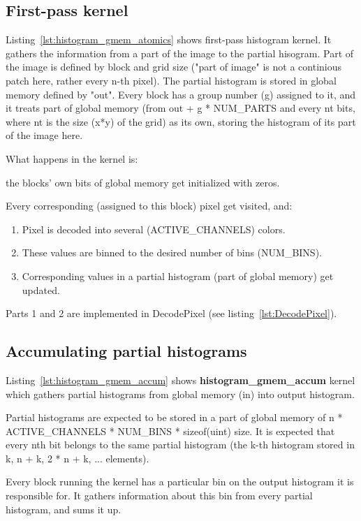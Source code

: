 \documentclass{article}
\begin{document}
\subsection{First-pass kernel}
Listing~\ref{lst:histogram_gmem_atomics} shows first-pass histogram kernel.
It gathers the information from a part of the image to the partial hisogram.
Part of the image is defined by block and grid size
("part of image" is not a continious patch here, rather every n-th pixel).
The partial histogram is stored in global memory defined by "out".
Every block has a group number (g) assigned to it, and it treats part of
global memory (from out + g * NUM\_PARTS and every nt bits, where nt is the size (x*y)
of the grid) as its own, storing the histogram of its part of the image here.

What happens in the kernel is:

the blocks' own bits of global memory get initialized with zeros.

Every corresponding (assigned to this block) pixel get visited, and:

\begin{enumerate}
\item Pixel is decoded into several (ACTIVE\_CHANNELS) colors.
\item These values are binned to the desired number of bins (NUM\_BINS).
\item Corresponding values in a partial histogram (part of global memory) get updated.
\end{enumerate}

Parts 1 and 2 are implemented in DecodePixel (see listing~\ref{lst:DecodePixel}).

\subsection{Accumulating partial histograms}
Listing~\ref{lst:histogram_gmem_accum} shows \textbf{histogram\_gmem\_accum} kernel
which gathers partial histograms from global memory (in) into output histogram.

Partial histograms are expected to be stored in a part of global memory of
n * ACTIVE\_CHANNELS * NUM\_BINS * sizeof(uint) size.
It is expected that every nth bit belongs to the same partial histogram
(the k-th histogram stored in k, n + k, 2 * n + k, ... elements).

Every block running the kernel has a particular bin on the output histogram it is
responsible for. It gathers information about this bin from every partial histogram,
and sums it up.
\end{document}
